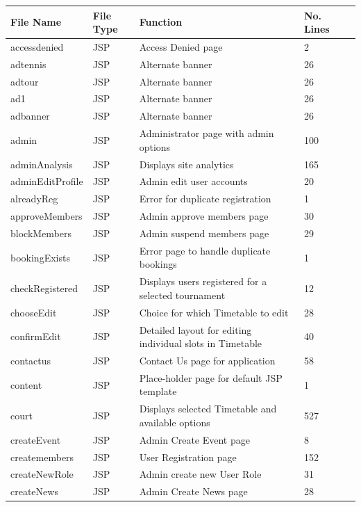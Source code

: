 \begin{table}[H]
\begin{center}
     \begin{tabular}{| l | l | l| l |p{1cm} |}
    \hline
    File Name & File Type & Function & No. Lines\\ \hline
	accessdenied & JSP & Access Denied page & 2\\ \hline
	adtennis & JSP & Alternate banner & 26\\ \hline	
	adtour & JSP & Alternate banner & 26\\ \hline	
	ad1 & JSP & Alternate banner & 26\\ \hline	
	adbanner & JSP & Alternate banner & 26\\ \hline		
	admin & JSP & Administrator page with admin options & 100\\ \hline	
	adminAnalysis & JSP & Displays site analytics & 165\\ \hline	
	adminEditProfile & JSP & Admin edit user accounts & 20\\ \hline	
	alreadyReg & JSP & Error for duplicate registration & 1 \\ \hline	
	approveMembers & JSP & Admin approve members page & 30\\ \hline	
	blockMembers & JSP & Admin suspend members page & 29\\ \hline	
	bookingExists & JSP & Error page to handle duplicate bookings & 1\\ \hline	
	checkRegistered & JSP & Displays users registered for a selected tournament & 12\\ \hline	
	chooseEdit & JSP & Choice for which Timetable to edit & 28\\ \hline	
	confirmEdit & JSP & Detailed layout for editing individual slots in Timetable & 40\\ \hline	
	contactus & JSP & Contact Us page for application & 58\\ \hline	
	content & JSP & Place-holder page for default JSP template & 1\\ \hline	
	court & JSP & Displays selected Timetable and available options & 527\\ \hline	
	createEvent & JSP & Admin Create Event page & 8\\ \hline	
	createmembers & JSP & User Registration page & 152\\ \hline	
	createNewRole & JSP & Admin create new User Role & 31\\ \hline	
	createNews & JSP & Admin Create News page & 28\\ \hline	

\end{tabular}
\end{center}
\end{table}
